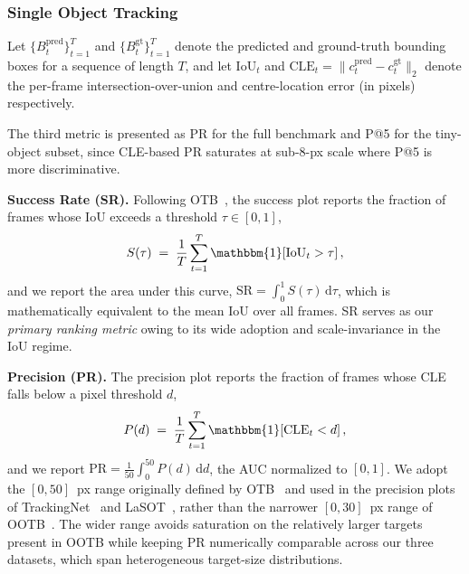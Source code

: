 \documentclass{article}
\begin{document}
\subsubsection{Single Object Tracking}
Let $\{B_t^{\mathrm{pred}}\}_{t=1}^{T}$ and $\{B_t^{\mathrm{gt}}\}_{t=1}^{T}$
denote the predicted and ground-truth bounding boxes for a sequence of length
$T$, and let $\mathrm{IoU}_t$ and $\mathrm{CLE}_t = \lVert c_t^{\mathrm{pred}} -
c_t^{\mathrm{gt}} \rVert_2$ denote the per-frame intersection-over-union and
centre-location error (in pixels) respectively.
 
The third metric is presented as PR for the full benchmark and P@5 for the
tiny-object subset, since CLE-based PR saturates at sub-8-px scale where P@5 is
more discriminative.

\noindent\textbf{Success Rate (SR).} Following OTB~\citep{wu2015otb}, the
success plot reports the fraction of frames whose IoU exceeds a threshold $\tau
\in [0, 1]$,
\begin{equation}
S(\tau) \;=\; \frac{1}{T} \sum_{t=1}^{T} \mathbbm{1}\!\left[\mathrm{IoU}_t > \tau\right],
\end{equation}
and we report the area under this curve, $\mathrm{SR} = \int_0^1 S(\tau)\,
\mathrm{d}\tau$, which is mathematically equivalent to the mean IoU over all
frames. SR serves as our \emph{primary ranking metric} owing to its wide
adoption and scale-invariance in the IoU regime.
 
\noindent\textbf{Precision (PR).} The precision plot reports the fraction of
frames whose CLE falls below a pixel threshold $d$,
\begin{equation}
P(d) \;=\; \frac{1}{T} \sum_{t=1}^{T} \mathbbm{1}\!\left[\mathrm{CLE}_t < d\right],
\end{equation}
and we report $\mathrm{PR} = \frac{1}{50} \int_0^{50} P(d)\, \mathrm{d}d$, the
AUC normalized to $[0,1]$. We adopt the $[0, 50]$~px range originally defined by
OTB~\citep{wu2015otb} and used in the precision plots of
TrackingNet~\citep{muller2018trackingnet} and LaSOT~\citep{fan2019lasot}, rather
than the narrower $[0, 30]$~px range of OOTB~\citep{chen2024ootb}. The wider
range avoids saturation on the relatively larger targets present in OOTB while
keeping PR numerically comparable across our three datasets, which span
heterogeneous target-size distributions.
 
\end{document}
